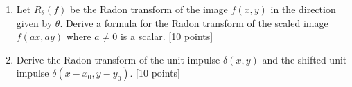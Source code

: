 \documentclass[11pt]{article}
\begin{document}
\begin{enumerate}
\item Let $R_{\theta}(f)$ be the Radon transform of the image $f(x,y)$ in the direction given by $\theta$. Derive a formula for the Radon transform of the scaled image $f(ax, ay)$ where $a \neq 0$ is a scalar. \textsf{[10 points]}

\item Derive the Radon transform of the unit impulse $\delta(x,y)$ and the shifted unit impulse $\delta(x-x_0,y-y_0)$. \textsf{[10 points]}

\end{enumerate}
\end{document}
